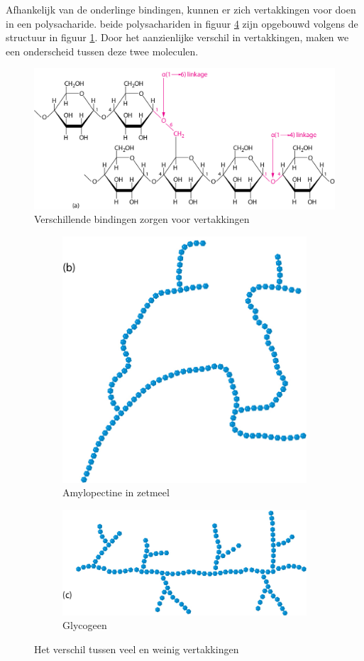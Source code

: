 \documentclass[a4paper,kul]{kulakarticle} %
\begin{document}
Afhankelijk van de onderlinge bindingen, kunnen er zich vertakkingen voor doen in een polysacharide. beide polysachariden in figuur \ref{fig:vertakkingen} zijn opgebouwd volgens de structuur in figuur \ref{fig:vertakking}. Door het aanzienlijke verschil in vertakkingen, maken we een onderscheid tussen deze twee moleculen.
\begin{figure}[h]
	\centering
	\includegraphics[width=0.7\linewidth]{Vertakking}
	\caption[Vertakking]{Verschillende bindingen zorgen voor vertakkingen}
	\label{fig:vertakking}
\end{figure}

\begin{figure}[h]
	\centering
	\begin{subfigure}{.5\textwidth}
		\centering
		\includegraphics[width=.4\linewidth]{amylopectine_in_zetmeel.png}
		\caption{Amylopectine in zetmeel}
		\label{fig:sub1}
	\end{subfigure}%
	\begin{subfigure}{.7\textwidth}
		\centering
		\includegraphics[width=.4\linewidth]{Glycogeen.png}
		\caption{Glycogeen}
		\label{fig:sub2}
	\end{subfigure}
	\caption{Het verschil tussen veel en weinig vertakkingen}
	\label{fig:vertakkingen}
\end{figure}
\newpage
\end{document}
